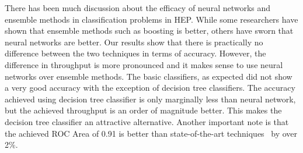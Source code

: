 There has been much discussion about the efficacy of neural networks and ensemble methods in classification problems in HEP. While some researchers have shown that ensemble methods such as boosting is better, others have sworn that neural networks are better. Our results show that there is practically no difference between the two techniques in terms of accuracy. However, the difference in throughput is more pronounced and it makes sense to use neural networks over ensemble methods. The basic classifiers, as expected  did not show a very good accuracy with the exception of decision tree classifiers. The accuracy achieved using decision tree classifier is only marginally less than neural network, but the achieved throughput is an order of magnitude better. This makes the decision tree classifier an attractive alternative. Another important note is that the achieved ROC Area of 0.91 is better than state-of-the-art techniques~\cite{DeepNN} by over 2\%.


